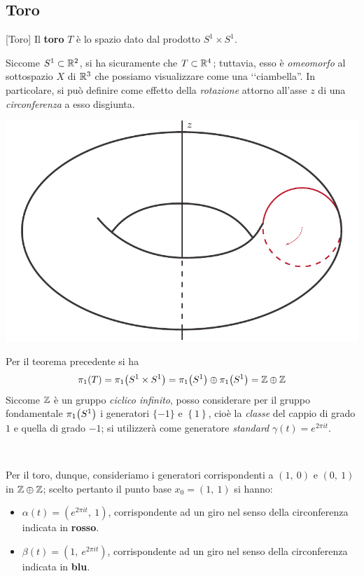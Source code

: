 \subsection{Toro}
\begin{definition}{}[Toro]\label{ciambella}
Il \textbf{toro} $T$ è lo spazio dato dal prodotto $S^1\times S^1$.
\end{definition}
	Siccome $S^1\subset\mathbb{R}^2$, si ha sicuramente che $T\subset \mathbb{R}^4$; tuttavia, esso è \textit{omeomorfo} al sottospazio $X$ di $\mathbb{R}^3$ che possiamo visualizzare come una ‘‘ciambella''.
	In particolare, si può definire come effetto della \textit{rotazione} attorno all'asse $z$ di una \textit{circonferenza} a esso disgiunta.\\
	\begin{minipage}{.42\linewidth}
		\begin{center}
				\includegraphics[trim=0cm 0cm 0cm 0cm,clip,scale=0.45]{images/torusalone.pdf}
		\end{center}
	\end{minipage}
	\begin{minipage}{.57\linewidth}
	Per il teorema precedente si ha
\begin{equation*}
	\homotopy[1]{T}=\homotopy[1]{S^1\times S^1}=\homotopy[1]{S^1}\oplus\homotopy[1]{S^1}=\Z\oplus\Z
\end{equation*}
Siccome $\mathbb{Z}$ è un gruppo \textit{ciclico infinito}, posso considerare per il gruppo fondamentale $\homotopy[1]{S^1}$ i generatori $\{-1\}$ e $\left\{1\right\}$, cioè la \textit{classe} del cappio di grado $1$ e quella di grado $-1$; si utilizzerà come generatore \textit{standard} $\gamma(t)=e^{2\pi i t}$.
	\end{minipage}\\
\begin{minipage}{.52\linewidth}
Per il toro, dunque, consideriamo i generatori corrispondenti a $(1,\ 0)$ e $(0,\ 1)$ in $\mathbb{Z}\oplus\mathbb{Z}$; scelto pertanto il punto base $x_0=(1,\ 1)$ si hanno:
\begin{itemize}
	\item $\alpha(t)=(e^{2\pi i t},\ 1)$, corrispondente ad un giro nel senso della circonferenza indicata in \textcolor{redill}{\textbf{rosso}}.
	\item $\beta(t)=(1,\ e^{2\pi i t})$, corrispondente ad un giro nel senso della circonferenza indicata in \textcolor{blueill}{\textbf{blu}}.
\end{itemize}
\end{minipage}
